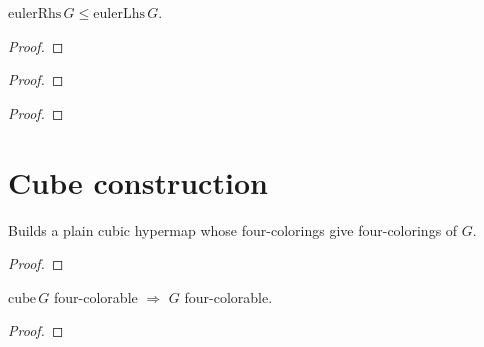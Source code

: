 \begin{theorem}
  \label{thm:euler-le}
  \leanok
  $\mathrm{eulerRhs}\,G \le \mathrm{eulerLhs}\,G$.
\end{theorem}
\begin{proof}\leanok\end{proof}

\begin{theorem}
  \label{thm:jordan-planar}
  \leanok
\end{theorem}
\begin{proof}\notready\end{proof}

\begin{theorem}
  \label{thm:planar-jordan}
  \leanok
\end{theorem}
\begin{proof}\notready\end{proof}

\chapter{Cube construction}


\begin{definition}
  \label{def:cube}
  \leanok
  Builds a plain cubic hypermap whose four-colorings give four-colorings of $G$.
\end{definition}

\begin{theorem}
  \label{thm:cube-plain-cubic}
  \leanok
\end{theorem}
\begin{proof}\leanok\end{proof}

\begin{theorem}
  \label{thm:cube-colorable}
  \leanok
  $\mathrm{cube}\,G$ four-colorable $\Rightarrow$ $G$ four-colorable.
\end{theorem}
\begin{proof}\leanok\end{proof}

